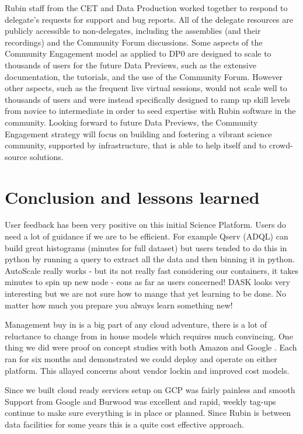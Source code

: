 Rubin staff from the CET and Data Production worked together to respond to delegate's requests for support and bug reports.
All of the delegate resources are publicly accessible to non-delegates, including the assemblies (and their recordings) and the Community Forum discussions.
Some aspects of the Community Engagement model as applied to DP0 are designed to scale to thousands of users for the future Data Previews, such as the extensive documentation, the tutorials, and the use of the Community Forum.
However other aspects, such as the frequent live virtual sessions, would not scale well to thousands of users and were instead specifically designed to ramp up skill levels from novice to intermediate in order to seed expertise with Rubin software in the community.
Looking forward to future Data Previews, the Community Engagement strategy will focus on building and fostering a vibrant science community,
supported by infrastructure, that is able to help itself and to crowd-source solutions.

\section{Conclusion and lessons learned}
User feedback has been very positive on this initial Science Platform.
Users do need a lot of guidance if we are to be efficient.
For example Qserv (ADQL) can build great histograms (minutes for full dataset) but users
tended to do this in python by running a query to extract all the data and then binning it in python.
AutoScale really works - but its not really fast considering our containers, it takes minutes to spin up new node - eons as far as users concerned!
DASK looks very interesting but we are not sure how to mange that yet learning to be done.
No matter how much you prepare you always learn something new!

Management buy in is a big part of any cloud adventure, there is a  lot of reluctance to change from in house models
which requires much convincing. One thing we did were proof on concept studies with both Amazon \citep{2019AAS...23324505B,DMTN-137} and Google \citep{DMTN-125}. Each ran for six months and demonstrated we could deploy and operate on either platform. This allayed concerns about vendor lockin and improved cost models.

Since we built cloud ready services setup on GCP was fairly painless and smooth
Support from Google and Burwood was excellent and rapid, weekly tag-ups continue to make sure everything is in place or planned.
Since Rubin is between data facilities for some years this is a quite cost effective approach.






